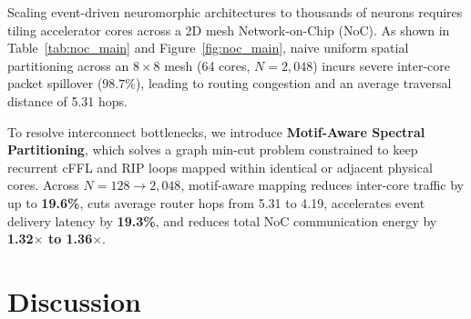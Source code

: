 \documentclass[10pt,twocolumn,letterpaper]{article}
\begin{document}
Scaling event-driven neuromorphic architectures to thousands of neurons requires tiling accelerator cores across a 2D mesh Network-on-Chip (NoC). As shown in Table~\ref{tab:noc_main} and Figure~\ref{fig:noc_main}, naive uniform spatial partitioning across an $8 \times 8$ mesh (64 cores, $N=2,048$) incurs severe inter-core packet spillover ($98.7\%$), leading to routing congestion and an average traversal distance of 5.31 hops.

\begin{table}[t]
\centering
\small
\caption{\textbf{Multi-Core 2D Mesh NoC Scaling ($N=128 \to 2,048$).}}
\label{tab:noc_main}
\end{table}

To resolve interconnect bottlenecks, we introduce \textbf{Motif-Aware Spectral Partitioning}, which solves a graph min-cut problem constrained to keep recurrent cFFL and RIP loops mapped within identical or adjacent physical cores. Across $N=128 \to 2,048$, motif-aware mapping reduces inter-core traffic by up to \textbf{19.6\%}, cuts average router hops from 5.31 to 4.19, accelerates event delivery latency by \textbf{19.3\%}, and reduces total NoC communication energy by \textbf{1.32$\times$ to 1.36$\times$}.

\section{Discussion}
\end{document}
